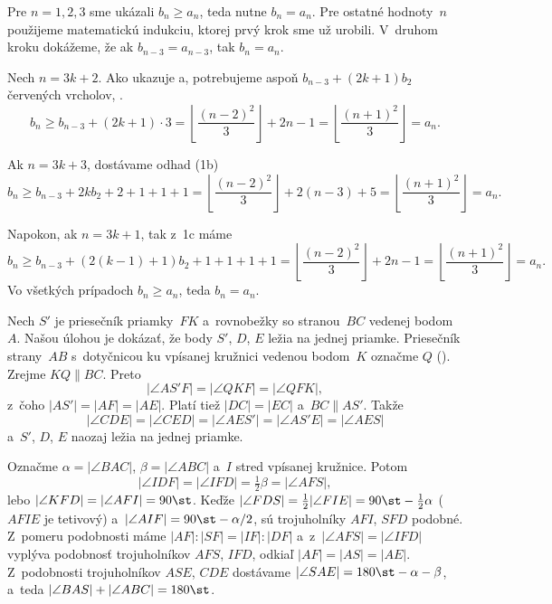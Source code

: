 {%


Pre $n = 1,2,3$ sme ukázali $b_n\ge a_n$, teda nutne $b_n = a_n$.
Pre ostatné hodnoty~$n$ použijeme matematickú indukciu, ktorej prvý krok sme už urobili. V~druhom kroku dokážeme, že ak $b_{n-3} = a_{n-3}$, tak $b_n = a_n$.

Nech $n = 3k+2$. Ako ukazuje \obr{}a, potrebujeme aspoň $b_{n-3}+(2k+1)b_2$ červených vrcholov, \tj.
$$
b_n\ge b_{n-3} + (2k + 1)\cdot 3 = \left\lfloor\frac{(n-2)^2}3\right\rfloor + 2n - 1 = \left\lfloor\frac{(n+1)^2}3\right\rfloor=a_n.
$$

Ak $n = 3k + 3$, dostávame odhad (\obrr1b)
$$
b_n \ge  b_{n-3} + 2kb_2 + 2 + 1 + 1 + 1 = \left\lfloor\frac{(n-2)^2}3\right\rfloor+2(n - 3) + 5 = \left\lfloor\frac{(n+1)^2}3\right\rfloor=a_n.
$$
%

Napokon, ak $n = 3k + 1$, tak z~\obrr1c máme
$$
b_n \ge b_{n-3} + (2(k-1) + 1)b_2 + 1 + 1 + 1 + 1 = \left\lfloor\frac{(n-2)^2}3\right\rfloor+2n-1=\left\lfloor\frac{(n+1)^2}3\right\rfloor=a_n.
$$
Vo všetkých prípadoch $b_n \ge a_n$, teda $b_n=a_n$.
%
}

{%
Nech $S'$ je priesečník priamky~$FK$ a~rovnobežky so stranou~$BC$ vedenej bodom~$A$. Našou úlohou je dokázať, že body $S'$, $D$, $E$ ležia na jednej priamke. Priesečník strany~$AB$ s~dotyčnicou ku vpísanej kružnici vedenou bodom~$K$ označme $Q$ (\obr). Zrejme $KQ\parallel BC$. Preto
$$
|\angle AS'F|=|\angle QKF|=|\angle QFK|,
$$
z~čoho $|AS'|=|AF|=|AE|$. Platí tiež $|DC|=|EC|$ a~$BC\parallel AS'$. Takže
$$
|\angle CDE|=|\angle CED|=|\angle AES'|=|\angle AS'E|=|\angle AES|
$$
a~$S'$, $D$, $E$ naozaj ležia na jednej priamke.
%

\ineriesenie
Označme $\alpha=|\angle BAC|$, $\beta=|\angle ABC|$ a~$I$ stred vpísanej kružnice. Potom
$$
|\angle IDF|=|\angle IFD|=\tfrac12\beta=|\angle AFS|,
$$
lebo $|\angle KFD|=|\angle AFI|=90\st$. Keďže $|\angle FDS|=\frac12|\angle FIE|=90\st-\frac12\alpha$ ($AFIE$ je tetivový) a~$|\angle AIF|=90\st-\alpha/2$, sú trojuholníky $AFI$, $SFD$ podobné. Z~pomeru podobnosti máme $|AF|:|SF|=|IF|:|DF|$ a~z~$|\angle AFS|=|\angle IFD|$ vyplýva podobnosť trojuholníkov $AFS$, $IFD$, odkiaľ $|AF|=|AS|=|AE|$. Z~podobnosti trojuholníkov $ASE$, $CDE$ dostávame $|\angle SAE|=180\st-\alpha-\beta$, a~teda $|\angle BAS|+|\angle ABC|=180\st$.
}

